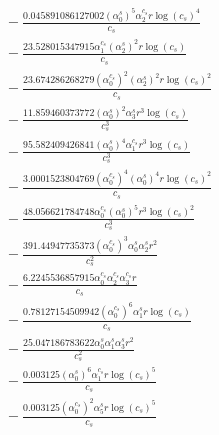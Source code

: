 \documentclass[10pt]{article}
\begin{document}
\begin{align*}
&{}  - \frac{0.045891086127002 \left(\alpha_{0}^s\right)^{5} \alpha_{2}^{c_s} r \log{\left(c_{s} \right)}^{4}}{c_{s}} \\
&{}  - \frac{23.528015347915 \alpha_{1}^{c_s} \left(\alpha_{2}^s\right)^{2} r \log{\left(c_{s} \right)}}{c_{s}} \\
&{}  - \frac{23.674286268279 \left(\alpha_{0}^{c_s}\right)^{2} \left(\alpha_{2}^s\right)^{2} r \log{\left(c_{s} \right)}^{2}}{c_{s}} \\
&{}  - \frac{11.859460373772 \left(\alpha_{0}^s\right)^{2} \alpha_{3}^s r^{3} \log{\left(c_{s} \right)}}{c_{s}^{3}} \\
&{}  - \frac{95.582409426841 \left(\alpha_{0}^s\right)^{4} \alpha_{1}^{c_s} r^{3} \log{\left(c_{s} \right)}}{c_{s}^{3}} \\
&{}  - \frac{3.0001523804769 \left(\alpha_{0}^{c_s}\right)^{4} \left(\alpha_{0}^s\right)^{4} r \log{\left(c_{s} \right)}^{2}}{c_{s}} \\
&{}  - \frac{48.056621784748 \alpha_{0}^{c_s} \left(\alpha_{0}^s\right)^{5} r^{3} \log{\left(c_{s} \right)}^{2}}{c_{s}^{3}} \\
&{}  - \frac{391.44947735373 \left(\alpha_{0}^{c_s}\right)^{3} \alpha_{0}^s \alpha_{2}^s r^{2}}{c_{s}^{2}} \\
&{}  - \frac{6.2245536857915 \alpha_{0}^{c_s} \alpha_{2}^{c_s} \alpha_{3}^{c_s} r}{c_{s}} \\
&{}  - \frac{0.78127154509942 \left(\alpha_{0}^{c_s}\right)^{6} \alpha_{1}^s r \log{\left(c_{s} \right)}}{c_{s}} \\
&{}  - \frac{25.047186783622 \alpha_{0}^s \alpha_{1}^s \alpha_{3}^s r^{2}}{c_{s}^{2}} \\
&{}  - \frac{0.003125 \left(\alpha_{0}^s\right)^{6} \alpha_{1}^{c_s} r \log{\left(c_{s} \right)}^{5}}{c_{s}} \\
&{}  - \frac{0.003125 \left(\alpha_{0}^{c_s}\right)^{2} \alpha_{5}^s r \log{\left(c_{s} \right)}^{5}}{c_{s}}
\end{align*}
\end{document}
